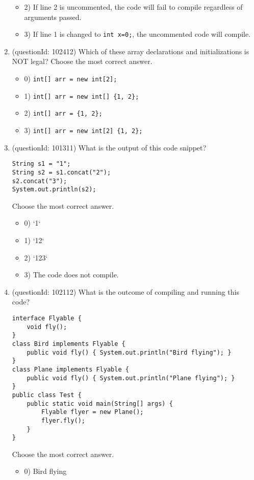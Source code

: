 \documentclass[12pt]{article}
\begin{document}
\begin{enumerate}[label=(\arabic*)]
\begin{itemize}
\item 2) If line 2 is uncommented, the code will fail to compile regardless of arguments passed.

\item 3) If line 1 is changed to \verb|int x=0;|, the uncommented code will compile.

\end{itemize}
\item (questionId: 102412) Which of these array declarations and initializations is NOT legal?
Choose the most correct answer. 
\begin{itemize}
\item 0) \verb|int[] arr = new int[2];|

\item 1) \verb|int[] arr = new int[] {1, 2};|

\item 2) \verb|int[] arr = {1, 2};|

\item 3) \verb|int[] arr = new int[2] {1, 2};|

\end{itemize}
\item (questionId: 101311) What is the output of this code snippet?
\begin{verbatim}
String s1 = "1";
String s2 = s1.concat("2");
s2.concat("3");
System.out.println(s2);
\end{verbatim}
Choose the most correct answer. 
\begin{itemize}
\item 0) `1`

\item 1) `12`

\item 2) `123`

\item 3) The code does not compile.

\end{itemize}
\item (questionId: 102112) What is the outcome of compiling and running this code?\n\begin{verbatim}
interface Flyable {
    void fly();
}
class Bird implements Flyable {
    public void fly() { System.out.println("Bird flying"); }
}
class Plane implements Flyable {
    public void fly() { System.out.println("Plane flying"); }
}
public class Test {
    public static void main(String[] args) {
        Flyable flyer = new Plane();
        flyer.fly();
    }
}
\end{verbatim}
Choose the most correct answer. 
\begin{itemize}
\item 0) Bird flying


\end{itemize}
\end{enumerate}
\end{document}
